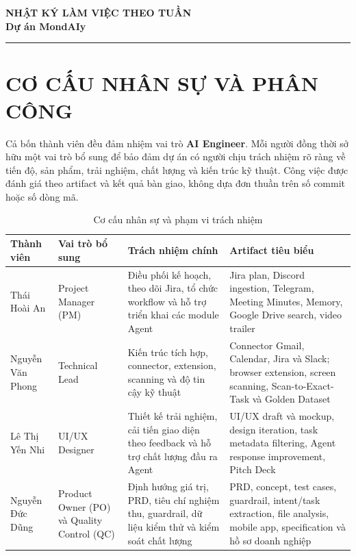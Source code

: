 \documentclass[12pt,a4paper]{article}
\begin{document}
\setlength{\emergencystretch}{3em}
\hfuzz=20pt
\vfuzz=20pt

\begin{center}
    {\LARGE\color{VinBlue}\textbf{NHẬT KÝ LÀM VIỆC THEO TUẦN}}\\[0.35em]
    {\Large\textbf{Dự án MondAIy}}\\[0.3em]
    {\color{VinGold}\rule{8cm}{1pt}}
\end{center}

\section{CƠ CẤU NHÂN SỰ VÀ PHÂN CÔNG}

\begin{summarybox}
Cả bốn thành viên đều đảm nhiệm vai trò \textbf{AI Engineer}. Mỗi người đồng thời
sở hữu một vai trò bổ sung để bảo đảm dự án có người chịu trách nhiệm rõ ràng về
tiến độ, sản phẩm, trải nghiệm, chất lượng và kiến trúc kỹ thuật. Công việc được
đánh giá theo artifact và kết quả bàn giao, không dựa đơn thuần trên số commit hoặc
số dòng mã.
\end{summarybox}

\begin{table}[H]
\centering
\caption{Cơ cấu nhân sự và phạm vi trách nhiệm}
\small
\sloppy
\renewcommand{\arraystretch}{1.22}
\begin{tabularx}{\textwidth}{P{2.4cm}P{3.6cm}Y P{4.3cm}}
\color{white}\textbf{Thành viên} & \color{white}\textbf{Vai trò bổ sung} &
\color{white}\textbf{Trách nhiệm chính} & \color{white}\textbf{Artifact tiêu biểu}\\
\toprule
Thái Hoài An & Project Manager (PM) & Điều phối kế hoạch, theo dõi Jira, tổ chức
workflow và hỗ trợ triển khai các module Agent & Jira plan, Discord ingestion,
Telegram, Meeting Minutes, Memory, Google Drive search, video trailer\\
Nguyễn Văn Phong & Technical Lead & Kiến trúc tích hợp, connector, extension,
scanning và độ tin cậy kỹ thuật & Connector Gmail, Calendar, Jira và Slack; browser
extension, screen scanning, Scan-to-Exact-Task và Golden Dataset\\
Lê Thị Yến Nhi & UI/UX Designer & Thiết kế trải nghiệm, cải tiến giao diện theo
feedback và hỗ trợ chất lượng đầu ra Agent & UI/UX draft và mockup, design iteration,
task metadata filtering, Agent response improvement, Pitch Deck\\
Nguyễn Đức Dũng & Product Owner (PO) và Quality Control (QC) & Định hướng giá trị,
PRD, tiêu chí nghiệm thu, guardrail, dữ liệu kiểm thử và kiểm soát chất lượng & PRD,
concept, test cases, guardrail, intent/task extraction, file analysis, mobile app,
specification và hồ sơ doanh nghiệp\\
\bottomrule
\end{tabularx}
\end{table}
\end{document}
